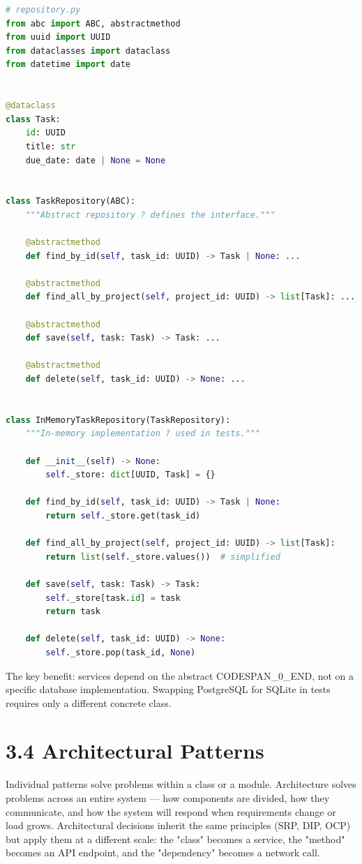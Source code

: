 \documentclass[11pt,a4paper]{book}
\begin{document}
\begin{lstlisting}[language=Python]
# repository.py
from abc import ABC, abstractmethod
from uuid import UUID
from dataclasses import dataclass
from datetime import date


@dataclass
class Task:
    id: UUID
    title: str
    due_date: date | None = None


class TaskRepository(ABC):
    """Abstract repository ? defines the interface."""

    @abstractmethod
    def find_by_id(self, task_id: UUID) -> Task | None: ...

    @abstractmethod
    def find_all_by_project(self, project_id: UUID) -> list[Task]: ...

    @abstractmethod
    def save(self, task: Task) -> Task: ...

    @abstractmethod
    def delete(self, task_id: UUID) -> None: ...


class InMemoryTaskRepository(TaskRepository):
    """In-memory implementation ? used in tests."""

    def __init__(self) -> None:
        self._store: dict[UUID, Task] = {}

    def find_by_id(self, task_id: UUID) -> Task | None:
        return self._store.get(task_id)

    def find_all_by_project(self, project_id: UUID) -> list[Task]:
        return list(self._store.values())  # simplified

    def save(self, task: Task) -> Task:
        self._store[task.id] = task
        return task

    def delete(self, task_id: UUID) -> None:
        self._store.pop(task_id, None)
\end{lstlisting}

The key benefit: services depend on the abstract CODESPAN\_0\_END, not on a specific database implementation. Swapping PostgreSQL for SQLite in tests requires only a different concrete class.

\medskip

\section{3.4 Architectural Patterns}

Individual patterns solve problems within a class or a module. Architecture solves problems across an entire system --- how components are divided, how they communicate, and how the system will respond when requirements change or load grows. Architectural decisions inherit the same principles (SRP, DIP, OCP) but apply them at a different scale: the "class" becomes a service, the "method" becomes an API endpoint, and the "dependency" becomes a network call.
\end{document}
